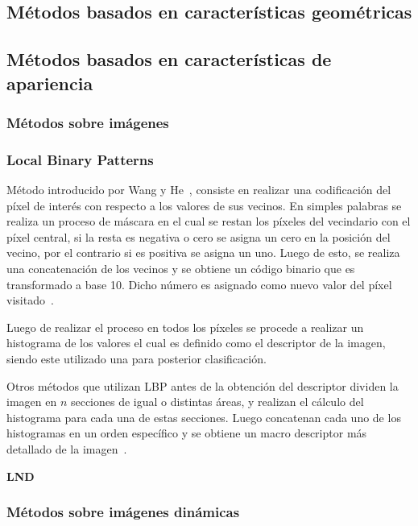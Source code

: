 \subsection{Métodos basados en características geométricas}
\label{sec:met_geo}

\subsection{Métodos basados en características de apariencia}
\label{sec:met_apa}

	\subsubsection{Métodos sobre imágenes}
	\label{sec:met_imagen}
	

		\subsubsection{Local Binary Patterns}
		\label{sec:lbp}
		Método introducido por Wang y He~\cite{Wang1990}, consiste en realizar una codificación del píxel de interés con respecto a los valores de sus vecinos. En simples palabras se realiza un proceso de máscara en el cual se restan los píxeles del vecindario con el píxel central, si la resta es negativa o cero se asigna un cero en la posición del vecino, por el contrario si es positiva se asigna un uno. Luego de esto, se realiza una concatenación de los vecinos y se obtiene un código binario que es transformado a base 10. Dicho número es asignado como nuevo valor del píxel visitado~\cite{Ojala1994,Ojala2002,Ahonen2004,Shan2009}.

Luego de realizar el proceso en todos los píxeles se procede a realizar un histograma de los valores el cual es definido como el descriptor de la imagen, siendo este utilizado una para posterior clasificación.

Otros métodos que utilizan LBP antes de la obtención del descriptor dividen la imagen en $n$ secciones de igual o distintas áreas, y realizan el cálculo del histograma para cada una de estas secciones. Luego concatenan cada uno de los histogramas en un orden específico y se obtiene un macro descriptor más detallado de la imagen~\cite{Ahonen2006}.

		\textbf{LND}
		\label{sec:lnd}

	\subsubsection{Métodos sobre imágenes dinámicas}	
	\label{sec:met_videos}

